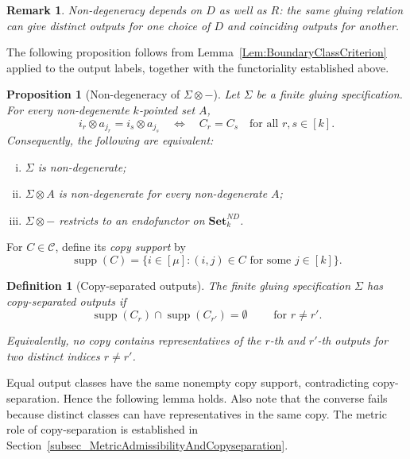\documentclass{sn-jnl}%
\theoremstyle{thmstyleone}%
\newtheorem{proposition}[theorem]{Proposition}%
\theoremstyle{thmstyletwo}%
\newtheorem{remark}{Remark}%
\theoremstyle{thmstylethree}%
\newtheorem{definition}{Definition}%
\newcommand{\setnd}{\mathbf{Set}_{k}^{ND}}
\newcommand{\M}{\Sigma}
\newcommand{\F}{\M\otimes}
\newcommand{\s}{\mu}
\begin{document}
\begin{remark}
    Non-degeneracy depends on $D$ as well as $R$: the same gluing relation can give distinct outputs for one choice of $D$ and coinciding outputs for another.
\end{remark}

The following proposition follows from Lemma~\ref{Lem:BoundaryClassCriterion} applied to the output labels, together with the functoriality established above.

\begin{proposition}[Non-degeneracy of $\F-$]
\label{Prop_EndofunctorOnSetND}
Let $\Sigma$ be a finite gluing specification. For every non-degenerate $k$-pointed set $A$,
\begin{equation}
\label{Lem_NonDegenerate_Set}
    i_r\otimes a_{j_r}=i_s\otimes a_{j_s} \quad\Longleftrightarrow\quad C_r=C_s \quad\text{for all }r,s\in[k].
\end{equation}
Consequently, the following are equivalent:
\begin{enumerate}[(i)]
    \item $\Sigma$ is non-degenerate;
    \item $\F A$ is non-degenerate for every non-degenerate $A$;
    \item $\F-$ restricts to an endofunctor on $\setnd$.
\end{enumerate}
\end{proposition}

For $C\in\mathcal C$, define its \emph{copy support} by
\begin{equation} \nonumber
   \operatorname{supp}(C) =\{i\in[\s]:(i,j)\in C\text{ for some }j\in[k]\}.
\end{equation}

\begin{definition}[Copy-separated outputs]
\label{Def_CopySeparatedOutputs}
    The finite gluing specification $\Sigma$ has \emph{copy-separated outputs} if
    \begin{equation}
        \operatorname{supp}(C_r)\cap\operatorname{supp}(C_{r'})=\emptyset \qquad \text{ for } r\neq r'.
    \label{eqn:Copy-separation}
    \tag{CS}
    \end{equation}
    
    Equivalently, no copy contains representatives of the $r$-th and $r'$-th outputs for two distinct indices $r\ne r'$.
\end{definition}

Equal output classes have the same nonempty copy support, contradicting copy-separation. Hence the following lemma holds. Also note that the converse fails because distinct classes can have representatives in the same copy. The metric role of copy-separation is established in Section~\ref{subsec_MetricAdmissibilityAndCopyseparation}.
\end{document}
